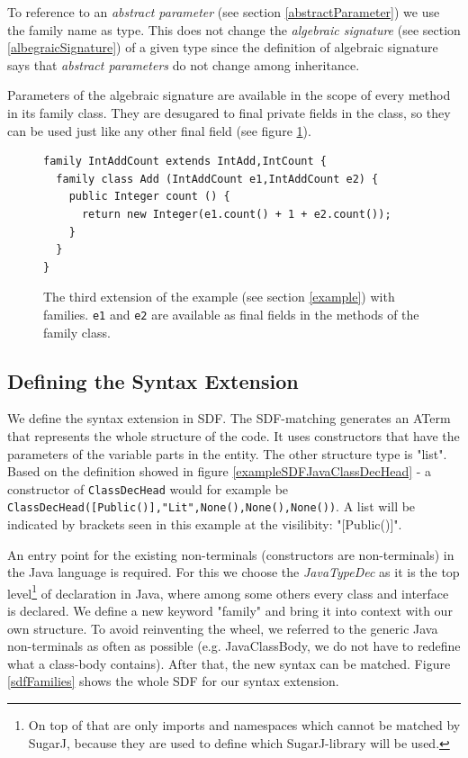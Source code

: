 \documentclass{report}
\begin{document}
\label{familyDependentType}
To reference to an \emph{abstract parameter} (see section \ref{abstractParameter}) we use the family name as type. This does not change the \emph{algebraic signature} (see section \ref{albegraicSignature}) of a given type since the definition of algebraic signature says that \emph{abstract parameters} do not change among inheritance.

Parameters of the algebraic signature are available in the scope of every method in its family class. They are desugared to final private fields in the class, so they can be used just like any other final field (see figure \ref{thirdExtensionFamily}).

\begin{figure}[h]
\begin{lstlisting}[language=exprExt]
family IntAddCount extends IntAdd,IntCount {
  family class Add (IntAddCount e1,IntAddCount e2) {
    public Integer count () {
      return new Integer(e1.count() + 1 + e2.count());
    }
  }
}
\end{lstlisting}
\caption{The third extension of the example (see section \ref{example}) with families. \lstinline{e1} and \lstinline{e2} are available as final fields in the methods of the family class.}
\label{thirdExtensionFamily}
\end{figure}


\subsection{Defining the Syntax Extension}
We define the syntax extension in SDF. The SDF-matching generates an ATerm that represents the whole structure of the code. It uses constructors that have the parameters of the variable parts in the entity. The other structure type is "list". Based on the definition showed in figure \ref{exampleSDFJavaClassDecHead} - a constructor of \lstinline{ClassDecHead} would for example be \lstinline[breaklines=false,morekeywords={field1,field2,field3,annot,typeParams,result,methodName,params,throws,body,rest},keywordstyle=\bfseries\color{OliveGreen}]{ClassDecHead([Public()],"Lit",None(),None(),None())}. A list will be indicated by brackets seen in this example at the visilibity: "[Public()]".

An entry point for the existing non-terminals (constructors are non-terminals) in the Java language is required. For this we choose the \emph{JavaTypeDec} as it is the top level\footnote{On top of that are only imports and namespaces which cannot be matched by SugarJ, because they are used to define which SugarJ-library will be used.} of declaration in Java, where among some others every class and interface is declared. We define a new keyword "family" and bring it into context with our own structure. To avoid reinventing the wheel, we referred to the generic Java non-terminals as often as possible (e.g. JavaClassBody, we do not have to redefine what a class-body contains). After that, the new syntax can be matched. Figure \ref{sdfFamilies} shows the whole SDF for our syntax extension.
\end{document}
